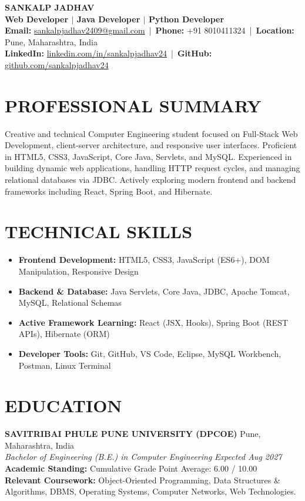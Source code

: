 \documentclass[10pt,letterpaper]{article}
\begin{document}
\begin{center}
    {\Huge \textbf{\color{navyblue} SANKALP JADHAV}} \\[3pt]
    {\small \textbf{Web Developer $|$ Java Developer $|$ Python Developer}} \\[3pt]
    {\footnotesize \textbf{Email:} \href{mailto:sankalpjadhav2409@gmail.com}{sankalpjadhav2409@gmail.com} \,|\, \textbf{Phone:} +91 8010411324 \,|\, \textbf{Location:} Pune, Maharashtra, India \\ \textbf{LinkedIn:} \href{https://linkedin.com/in/sankalpjadhav24}{linkedin.com/in/sankalpjadhav24} \,|\, \textbf{GitHub:} \href{https://github.com/sankalpjadhav24}{github.com/sankalpjadhav24}}
\end{center}

\vspace{-4pt}

\section*{PROFESSIONAL SUMMARY}
{\small Creative and technical Computer Engineering student focused on Full-Stack Web Development, client-server architecture, and responsive user interfaces. Proficient in HTML5, CSS3, JavaScript, Core Java, Servlets, and MySQL. Experienced in building dynamic web applications, handling HTTP request cycles, and managing relational databases via JDBC. Actively exploring modern frontend and backend frameworks including React, Spring Boot, and Hibernate.}

\section*{TECHNICAL SKILLS}
{\small
\begin{itemize}[leftmargin=1.0em, itemsep=2pt, parsep=0pt, topsep=2pt]
    \item \textbf{Frontend Development:} HTML5, CSS3, JavaScript (ES6+), DOM Manipulation, Responsive Design
    \item \textbf{Backend \& Database:} Java Servlets, Core Java, JDBC, Apache Tomcat, MySQL, Relational Schemas
    \item \textbf{Active Framework Learning:} React (JSX, Hooks), Spring Boot (REST APIs), Hibernate (ORM)
    \item \textbf{Developer Tools:} Git, GitHub, VS Code, Eclipse, MySQL Workbench, Postman, Linux Terminal
\end{itemize}
}

\section*{EDUCATION}
{\small
\textbf{SAVITRIBAI PHULE PUNE UNIVERSITY (DPCOE)} \hfill Pune, Maharashtra, India \\
\textit{Bachelor of Engineering (B.E.) in Computer Engineering} \hfill \textit{Expected Aug 2027} \\
\textbullet{} \textbf{Academic Standing:} Cumulative Grade Point Average: 6.00 / 10.00 \\
\textbullet{} \textbf{Relevant Coursework:} Object-Oriented Programming, Data Structures \& Algorithms, DBMS, Operating Systems, Computer Networks, Web Technologies.
}
\end{document}
